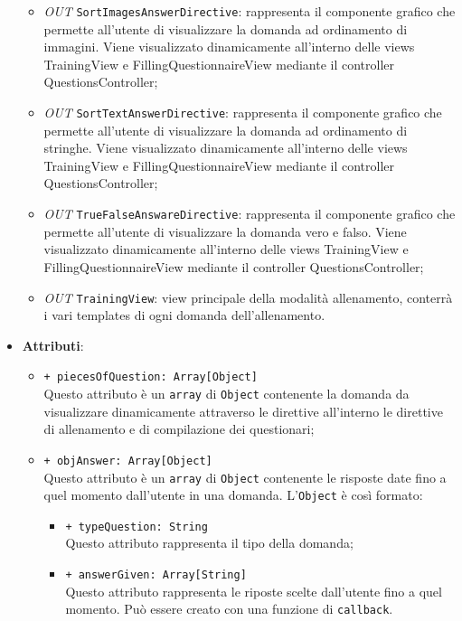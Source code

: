 \begin{itemize}
\begin{itemize}
		\item \textit{OUT} \texttt{SortImagesAnswerDirective}: rappresenta il componente grafico che permette all'utente di visualizzare la domanda ad ordinamento di immagini. Viene visualizzato dinamicamente all'interno delle views TrainingView e FillingQuestionnaireView mediante il controller QuestionsController;
		\item \textit{OUT} \texttt{SortTextAnswerDirective}: rappresenta il componente grafico che permette all'utente di visualizzare la domanda ad ordinamento di stringhe. Viene visualizzato dinamicamente all'interno delle views TrainingView e FillingQuestionnaireView mediante il controller QuestionsController;
		\item \textit{OUT} \texttt{TrueFalseAnswareDirective}: rappresenta il componente grafico che permette all'utente di visualizzare la domanda vero e falso. Viene visualizzato dinamicamente all'interno delle views TrainingView e FillingQuestionnaireView mediante il controller QuestionsController;	
		\item \textit{OUT} \texttt{TrainingView}: view principale della modalità allenamento, conterrà i vari templates di ogni domanda dell'allenamento.				
	\end{itemize}
	\item \textbf{Attributi}: 
	\begin{itemize}
		\item \texttt{+ piecesOfQuestion: Array[Object]} \\
		Questo attributo è un \texttt{array} di \texttt{Object} contenente la domanda da visualizzare dinamicamente attraverso le direttive all'interno le direttive di allenamento e di compilazione dei questionari;
		\item \texttt{+ objAnswer: Array[Object]} \\
		Questo attributo è un \texttt{array} di \texttt{Object} contenente le risposte date fino a quel momento dall'utente in una domanda. L'\texttt{Object} è così formato: \\
		\begin{itemize}
			\item \texttt{+ typeQuestion: String} \\
			Questo attributo rappresenta il tipo della domanda;
			\item \texttt{+ answerGiven: Array[String]} \\
			Questo attributo rappresenta le riposte scelte dall'utente fino a quel momento. Può essere creato con una funzione di \texttt{callback}.
		\end{itemize}

\end{itemize}
\end{itemize}
